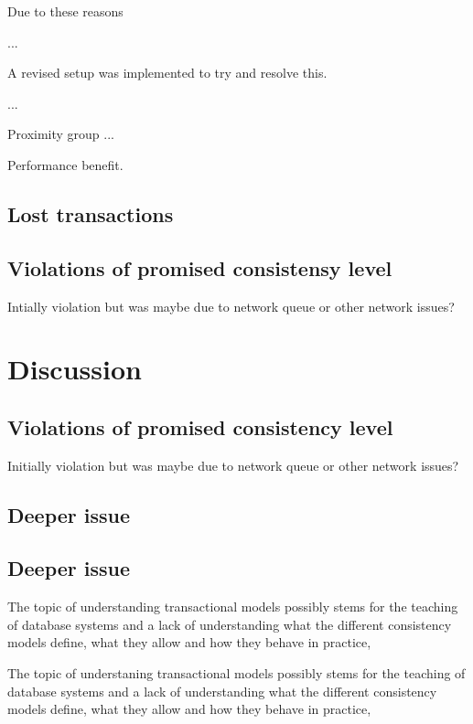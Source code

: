 \documentclass[a4paper,10pt,titlepage]{report}
\begin{document}
    Due to these reasons

    ...

    A revised setup was implemented to try and resolve this.

    ...

    Proximity group
    ...


    Performance benefit.

    \subsection{Lost transactions}

    \subsection{Violations of promised consistensy level}
    Intially violation but was maybe due to network queue or other network issues?


    \section{Discussion}
\subsection{Violations of promised consistency level}

    Initially violation but was maybe due to network queue or other network issues?


    \subsection{Deeper issue}
\subsection{Deeper issue}
The topic of understanding transactional models possibly stems for the teaching of database systems and a lack of understanding what the different consistency models define, what they allow and how they behave in practice,

    The topic of understaning transactional models possibly stems for the teaching of database systems and a lack of understanding what the different consistency models define, what they allow and how they behave in practice,
\end{document}
